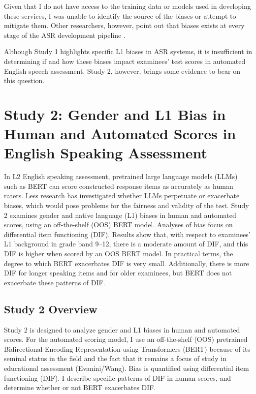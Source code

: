 \documentclass [PhD] {uclathes}
\begin{document}
Given that I do not have access to the training data or models used in developing these services, I was unable to identify the source of the biases or attempt to mitigate them. Other researchers, however, point out that biases exists at every stage of the ASR development pipeline \citep{hutiri2022, suresh2021framework}.

Although Study 1 highlights specific L1 biases in ASR systems, it is insufficient in determining if and how these biases impact examinees' test scores in automated English speech assessment. Study 2, however, brings some evidence to bear on this question. 



\chapter{Study 2: Gender and L1 Bias in Human and Automated Scores in English Speaking Assessment}

In L2 English speaking assessment, pretrained large language models (LLMs) such as BERT can score constructed response items as accurately as human raters. Less research has investigated whether LLMs perpetuate or exacerbate biases, which would pose problems for the fairness and validity of the test. Study 2 examines gender and native language (L1) biases in human and automated scores, using an off-the-shelf (OOS) BERT model. Analyses of bias focus on differential item functioning (DIF). Results show that, with respect to examinees’ L1 background in grade band 9–12, there is a moderate amount of DIF, and this DIF is higher when scored by an OOS BERT model. In practical terms, the degree to which BERT exacerbates DIF is very small. Additionally, there is more DIF for longer speaking items and for older examinees, but BERT does not exacerbate these patterns of DIF. 

\section{Study 2 Overview} 

Study 2 is designed to analyze gender and L1 biases in human and automated scores. For the automated scoring model, I use an off-the-shelf (OOS) pretrained Bidirectional Encoding Representation using Transformers (BERT) because of its seminal status in the field \citep{devlin2018} and the fact that it remains a focus of study in educational assessment (Evanini/Wang). Bias is quantified using differential item functioning (DIF). I describe specific patterns of DIF in human scores, and determine whether or not BERT exacerbates DIF. 
\end{document}

